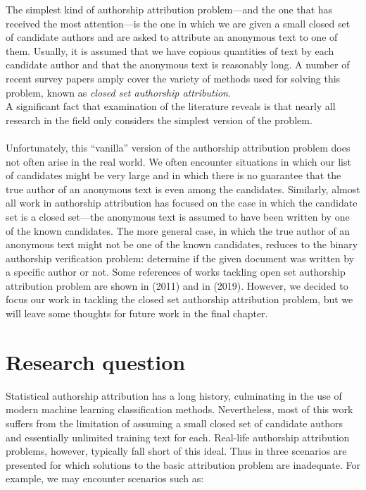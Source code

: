 The simplest kind of authorship attribution problem—and the one that has received the most attention—is the one in which we are given a small closed set of candidate authors and are asked to attribute an anonymous text to one of them. Usually, it is assumed that we have copious quantities of text by each candidate author and that the anonymous text is reasonably long. A number of recent survey papers amply cover the variety of methods used for solving this problem, known as \textit{closed set authorship attribution}.\\
A significant fact that examination of the literature reveals is that nearly all research in the field only considers the simplest version of the problem.\\\\
Unfortunately, this “vanilla” version of the authorship attribution problem does not often arise in the real world. We often encounter situations in which our list of candidates might be very large and in which there is no guarantee that the true author of an anonymous text is even among the candidates. \cite{koppel2012fundamental}
Similarly, almost all work in authorship attribution has focused on the case in which the candidate set is a closed set—the anonymous text is assumed to have been written by one of the known candidates. The more general case, in which the true author of an anonymous text might not be one of the known candidates, reduces to the binary authorship verification problem: determine if the given document was written by a specific author or not.
Some references of works tackling open set authorship attribution problem are shown in \citeauthor{koppel2011authorship} (2011) and in \citeauthor{badirli2019open} (2019).
However, we decided to focus our work in tackling the closed set authorship attribution problem, but we will leave some thoughts for future work in the final chapter.


\section{Research question}

Statistical authorship attribution has a long history, culminating in the use of modern machine learning classification methods. Nevertheless, most of this work suffers from the limitation of assuming a small closed set of candidate authors and essentially unlimited training text for each. Real-life authorship attribution problems, however, typically fall short of this ideal. Thus in \cite{koppel2009computational} three scenarios are presented for which solutions to the basic attribution problem are inadequate.
For example, we may encounter scenarios such as:

